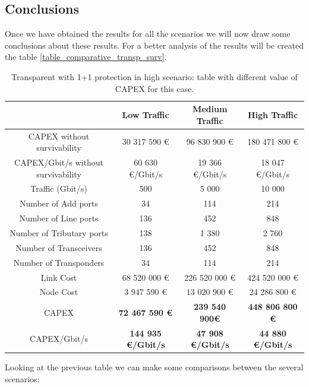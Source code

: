 \subsection{Conclusions}

Once we have obtained the results for all the scenarios we will now draw some conclusions about these results. For a better analysis of the results will be created the table \ref{table_comparative_transp_surv}.\\

\begin{table}[h!]
\centering
\begin{tabular}{| c | c | c | c |}
 \hline
  & Low Traffic & Medium Traffic  & High Traffic \\
 \hline\hline
 CAPEX without survivability&30 317 590 \euro&96 830 900 \euro&180 471 800 \euro\\ \hline
 CAPEX/Gbit/s without survivability&60 630 \euro/Gbit/s& 19 366 \euro/Gbit/s&18 047 \euro/Gbit/s\\ \hline
 Traffic (Gbit/s) & 500 & 5 000 & 10 000 \\ \hline
 Number of Add ports & 34 & 114 & 214 \\ \hline
 Number of Line ports & 136 & 452 & 848 \\ \hline
 Number of Tributary ports & 138 & 1 380 & 2 760 \\ \hline
 Number of Transceivers & 136 & 452 & 848 \\ \hline
 Number of Transponders & 34 & 114 & 214 \\ \hline
 Link Cost & 68 520 000 \euro & 226 520 000 \euro & 424 520 000 \euro \\ \hline
 Node Cost & 3 947 590 \euro & 13 020 900 \euro & 24 286 800 \euro \\ \hline
 CAPEX & \textbf{72 467 590 \euro} & \textbf{239 540 900\euro} & \textbf{448 806 800 \euro} \\ \hline
 CAPEX/Gbit/s & \textbf{144 935 \euro/Gbit/s} & \textbf{47 908 \euro/Gbit/s} & \textbf{44 880 \euro/Gbit/s}\\
 \hline
\end{tabular}
\caption{Transparent with 1+1 protection in high scenario: table with different value of CAPEX for this case.}
\label{table_comparative_transp_protec}
\end{table}

Looking at the previous table we can make some comparisons between the several scenarios:

